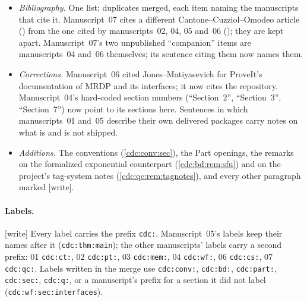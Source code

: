 \documentclass[11pt,a4paper]{article}
\theoremstyle{definition}
\theoremstyle{remark}
\newcommand{\wtag}{\textup{[write]}}%
\begin{document}
\begin{itemize}
\item \emph{Bibliography.} One list; duplicates merged, each item naming the manuscripts that cite it. Manuscript~07 cites a different Cantone--Cuzziol--Omodeo article (\cite{cco-six}) from the one cited by manuscripts~02, 04, 05 and~06 (\cite{cco2024}); they are kept apart. Manuscript~07's two unpublished ``companion'' items are manuscripts~04 and~06 themselves; its sentence citing them now names them.
\item \emph{Corrections.} Manuscript~06 cited Jones--Matiyasevich for ProveIt's documentation of MRDP and its interfaces; it now cites the repository. Manuscript~04's hard-coded section numbers (``Section~2'', ``Section~3'', ``Section~7'') now point to its sections here. Sentences in which manuscripts~01 and~05 describe their own delivered packages carry notes on what is and is not shipped.
\item \emph{Additions.} The conventions (\cref{cdc:conv:sec}), the Part openings, the remarks on the formalized exponential counterpart (\cref{cdc:bd:rem:sfu}) and on the project's tag-system notes (\cref{cdc:qc:rem:tagnotes}), and every other paragraph marked \wtag{}.
\end{itemize}

\paragraph{Labels.} \wtag{} Every label carries the prefix \texttt{cdc:}. Manuscript~05's labels keep their names after it (\texttt{cdc:thm:main}); the other manuscripts' labels carry a second prefix: 01 \texttt{cdc:ct:}, 02 \texttt{cdc:pt:}, 03 \texttt{cdc:mem:}, 04 \texttt{cdc:wf:}, 06 \texttt{cdc:cs:}, 07 \texttt{cdc:qc:}. Labels written in the merge use \texttt{cdc:conv:}, \texttt{cdc:bd:}, \texttt{cdc:part:}, \texttt{cdc:sec:}, \texttt{cdc:q:}, or a manuscript's prefix for a section it did not label (\texttt{cdc:wf:sec:interfaces}).
\end{document}
